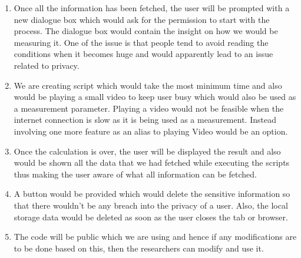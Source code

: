 \documentclass[journal]{IEEEtran}
\begin{document}
\begin{enumerate}
\item Once all the information has been fetched, the user will be prompted with a new dialogue box which would ask for the permission to start with the process. The dialogue box would contain the insight on how we would be measuring it. One of the issue is that people tend to avoid reading the conditions when it becomes huge and would apparently lead to an issue related to privacy.
\item We are creating script which would take the most minimum time and also would be playing a small video to keep user busy which would also be used as a measurement parameter. Playing a video would not be feasible when the internet connection is slow as it is being used as a measurement. Instead involving one more feature as an alias to playing Video would be an option.
\item Once the calculation is over, the user will be displayed the result and also would be shown all the data that we had fetched while executing the scripts thus making the user aware of what all information can be fetched. 
\item A button would be provided which would delete the sensitive information so that there wouldn't be any breach into the privacy of a user. Also, the local storage data would be deleted as soon as the user closes the tab or browser. 
\item The code will be public which we are using and hence if any modifications are to be done based on this, then the researchers can modify and use it. 
\end{enumerate}
\end{document}
